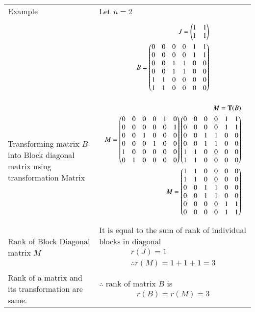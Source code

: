 \documentclass[journal,12pt,twocolumn]{IEEEtran}
\begin{document}
\begin{table}[h!]
\begin{center}
\begin{tabular}{ | m{5cm} | m{10cm}| } \hline 
Example &  Let $n=2$ \\&  
{ \begin{align*}
J = \begin{pmatrix}1&1\\1&1\end{pmatrix}\\
B = \begin{pmatrix}0&0&0&0&1&1\\0&0&0&0&1&1\\0&0&1&1&0&0\\0&0&1&1&0&0\\1&1&0&0&0&0\\1&1&0&0&0&0\end{pmatrix}
\end{align*}}\\  \hline
Transforming matrix $B$ into Block diagonal matrix using transformation Matrix & {\begin{align*}
M = \mathbf{T}(B)\\
M =  \begin{pmatrix}0&0&0&0&1&0\\0&0&0&0&0&1\\0&0&1&0&0&0\\0&0&0&1&0&0\\1&0&0&0&0&0\\0&1&0&0&0&0\end{pmatrix} \begin{pmatrix}0&0&0&0&1&1\\0&0&0&0&1&1\\0&0&1&1&0&0\\0&0&1&1&0&0\\1&1&0&0&0&0\\1&1&0&0&0&0\end{pmatrix}\\
M = \begin{pmatrix}1&1&0&0&0&0\\1&1&0&0&0&0\\0&0&1&1&0&0\\0&0&1&1&0&0\\0&0&0&0&1&1\\0&0&0&0&1&1\end{pmatrix}
\end{align*}}\\  \hline
Rank of Block Diagonal matrix $M$ & It is equal to the sum of rank of individual blocks in diagonal{\begin{align*}
r(J) = 1\\
\therefore r(M) = 1 + 1 + 1 = 3
\end{align*}}\\ \hline
Rank of a matrix and its transformation are same. & $\therefore$ rank of matrix $B$ is {\begin{align*}r(B) = r(M) =3
\end{align*}}\\ \hline 
\end{tabular}
\end{center}
\end{table}
\end{document}
